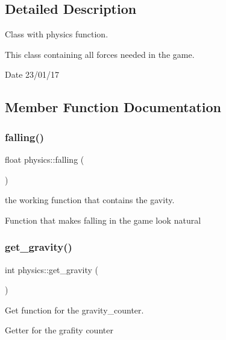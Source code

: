 \subsection{Detailed Description}
Class with physics function. 

This class containing all forces needed in the game.

\begin{DoxyDate}{Date}
23/01/17 
\end{DoxyDate}


\subsection{Member Function Documentation}
\mbox{\label{classphysics_acca1ee2fb8b760b6e4ee61ae7c2ee3da}} 
\subsubsection{\texorpdfstring{falling()}{falling()}}
{\footnotesize\ttfamily float physics\+::falling (\begin{DoxyParamCaption}{ }\end{DoxyParamCaption})}



the working function that contains the gavity. 

Function that makes falling in the game look natural \mbox{\label{classphysics_a3c4c6084fe0652b0bfd35afa5daa1c1e}} 
\subsubsection{\texorpdfstring{get\+\_\+gravity()}{get\_gravity()}}
{\footnotesize\ttfamily int physics\+::get\+\_\+gravity (\begin{DoxyParamCaption}{ }\end{DoxyParamCaption})}



Get function for the gravity\+\_\+counter. 

Getter for the grafity counter \mbox{\label{classphysics_aaf1c57aa6e35b9c83ccbfdfa8c18468c}} 
